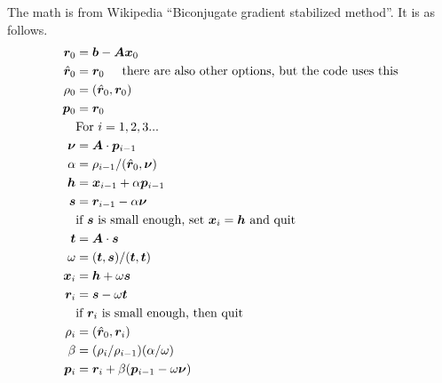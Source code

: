 \documentclass[11pt]{article}
\begin{document}
\begin{description}
The math is from Wikipedia ``Biconjugate gradient stabilized method''. It is as follows.
\begin{align*}
\bm{r}_0 &= \bm{b}-\bm{A}\bm{x}_0 \\
\hat{\bm{r}}_0 &= \bm{r}_0 \hspace{0.5cm} \textrm{there are also other options, but the code uses this} \\
\rho_0 &= (\hat{\bm{r}}_0, \bm{r}_0) \\
\bm{p}_0 &= \bm{r}_0 \\
&\textrm{For } i=1,2,3... \\
\bm{\nu} &= \bm{A} \cdot \bm{p}_{i-1} \\
\alpha &= \rho_{i-1}/(\hat{\bm{r}}_0, \bm{\nu}) \\
\bm{h} &= \bm{x}_{i-1} + \alpha \bm{p}_{i-1} \\
\bm{s} &= \bm{r}_{i-1} - \alpha \bm{\nu} \\
& \textrm{if $\bm{s}$ is small enough, set $\bm{x}_i = \bm{h}$ and quit} \\
\bm{t} &= \bm{A} \cdot \bm{s} \\
\omega &= (\bm{t}, \bm{s}) / (\bm{t}, \bm{t}) \\
\bm{x}_i &= \bm{h} + \omega \bm{s} \\
\bm{r}_i &= \bm{s} - \omega \bm{t} \\
& \textrm{if $\bm{r}_i$ is small enough, then quit} \\
\rho_i &= (\hat{\bm{r}}_0, \bm{r}_i) \\
\beta &= (\rho_i/\rho_{i-1})(\alpha/\omega) \\
\bm{p}_i &= \bm{r}_i + \beta(\bm{p}_{i-1}-\omega\bm{\nu})
\end{align*}




\end{description}



\end{document}
